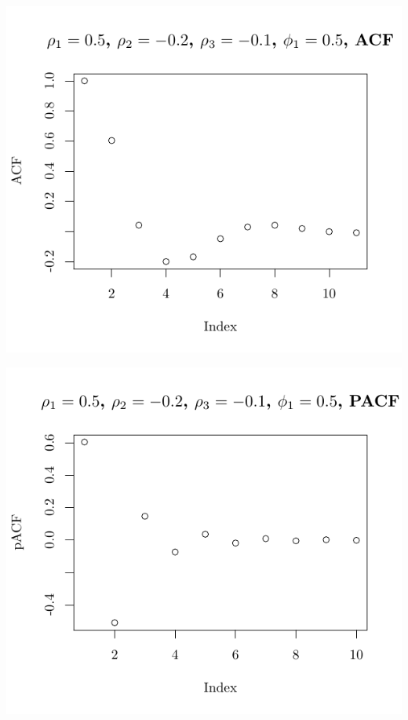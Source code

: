 \documentclass[10pt]{paper}\usepackage[]{graphicx}\usepackage[]{color}
\makeatletter
\def\maxwidth{ %
  \ifdim\Gin@nat@width>\linewidth
    \linewidth
  \else
    \Gin@nat@width
  \fi
}
\newenvironment{knitrout}{}{} %
\makeatother
\begin{document}
\begin{knitrout}
{\centering \includegraphics[width=\maxwidth]{figure/graphics-plotter-131} 

}




{\centering \includegraphics[width=\maxwidth]{figure/graphics-plotter-132} 

}





\end{knitrout}
\end{document}
